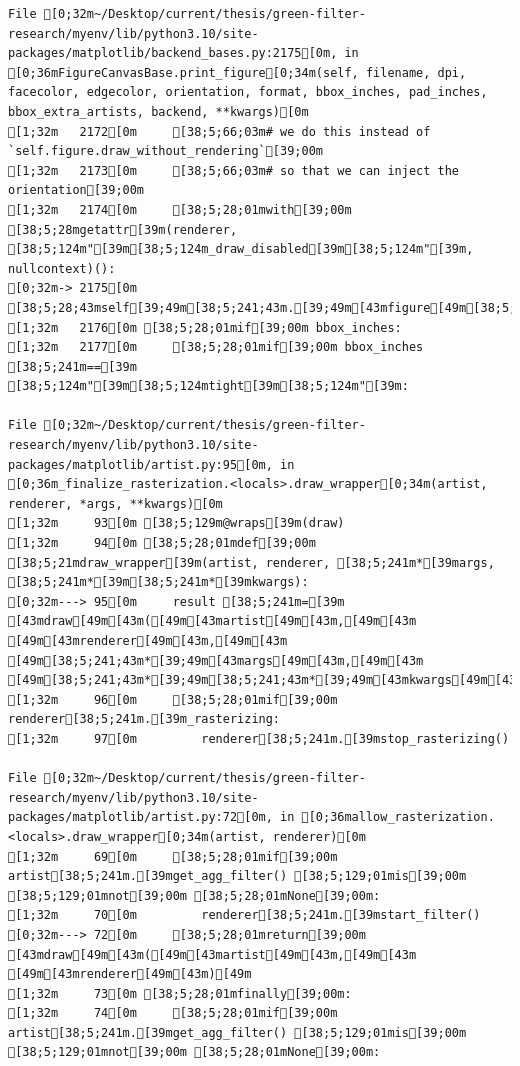 \documentclass[
  letterpaper,
  DIV=11,
  numbers=noendperiod]{scrartcl}
\begin{document}
\begin{verbatim}
File [0;32m~/Desktop/current/thesis/green-filter-research/myenv/lib/python3.10/site-packages/matplotlib/backend_bases.py:2175[0m, in [0;36mFigureCanvasBase.print_figure[0;34m(self, filename, dpi, facecolor, edgecolor, orientation, format, bbox_inches, pad_inches, bbox_extra_artists, backend, **kwargs)[0m
[1;32m   2172[0m     [38;5;66;03m# we do this instead of `self.figure.draw_without_rendering`[39;00m
[1;32m   2173[0m     [38;5;66;03m# so that we can inject the orientation[39;00m
[1;32m   2174[0m     [38;5;28;01mwith[39;00m [38;5;28mgetattr[39m(renderer, [38;5;124m"[39m[38;5;124m_draw_disabled[39m[38;5;124m"[39m, nullcontext)():
[0;32m-> 2175[0m         [38;5;28;43mself[39;49m[38;5;241;43m.[39;49m[43mfigure[49m[38;5;241;43m.[39;49m[43mdraw[49m[43m([49m[43mrenderer[49m[43m)[49m
[1;32m   2176[0m [38;5;28;01mif[39;00m bbox_inches:
[1;32m   2177[0m     [38;5;28;01mif[39;00m bbox_inches [38;5;241m==[39m [38;5;124m"[39m[38;5;124mtight[39m[38;5;124m"[39m:

File [0;32m~/Desktop/current/thesis/green-filter-research/myenv/lib/python3.10/site-packages/matplotlib/artist.py:95[0m, in [0;36m_finalize_rasterization.<locals>.draw_wrapper[0;34m(artist, renderer, *args, **kwargs)[0m
[1;32m     93[0m [38;5;129m@wraps[39m(draw)
[1;32m     94[0m [38;5;28;01mdef[39;00m [38;5;21mdraw_wrapper[39m(artist, renderer, [38;5;241m*[39margs, [38;5;241m*[39m[38;5;241m*[39mkwargs):
[0;32m---> 95[0m     result [38;5;241m=[39m [43mdraw[49m[43m([49m[43martist[49m[43m,[49m[43m [49m[43mrenderer[49m[43m,[49m[43m [49m[38;5;241;43m*[39;49m[43margs[49m[43m,[49m[43m [49m[38;5;241;43m*[39;49m[38;5;241;43m*[39;49m[43mkwargs[49m[43m)[49m
[1;32m     96[0m     [38;5;28;01mif[39;00m renderer[38;5;241m.[39m_rasterizing:
[1;32m     97[0m         renderer[38;5;241m.[39mstop_rasterizing()

File [0;32m~/Desktop/current/thesis/green-filter-research/myenv/lib/python3.10/site-packages/matplotlib/artist.py:72[0m, in [0;36mallow_rasterization.<locals>.draw_wrapper[0;34m(artist, renderer)[0m
[1;32m     69[0m     [38;5;28;01mif[39;00m artist[38;5;241m.[39mget_agg_filter() [38;5;129;01mis[39;00m [38;5;129;01mnot[39;00m [38;5;28;01mNone[39;00m:
[1;32m     70[0m         renderer[38;5;241m.[39mstart_filter()
[0;32m---> 72[0m     [38;5;28;01mreturn[39;00m [43mdraw[49m[43m([49m[43martist[49m[43m,[49m[43m [49m[43mrenderer[49m[43m)[49m
[1;32m     73[0m [38;5;28;01mfinally[39;00m:
[1;32m     74[0m     [38;5;28;01mif[39;00m artist[38;5;241m.[39mget_agg_filter() [38;5;129;01mis[39;00m [38;5;129;01mnot[39;00m [38;5;28;01mNone[39;00m:


\end{verbatim}
\end{document}
